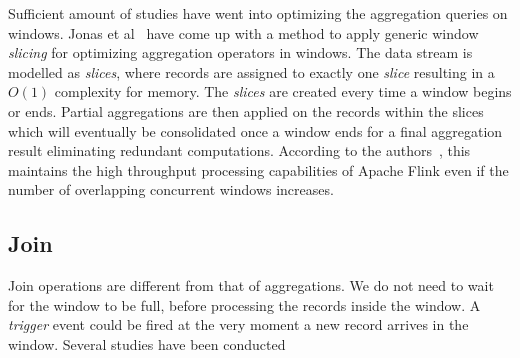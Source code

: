 Sufficient amount of studies have went into optimizing the aggregation queries 
on windows. Jonas et al~\cite{scotty, jonas_scotty} have come up with a method to 
apply generic window \emph{slicing} for optimizing aggregation operators in windows. 
The data stream is modelled as \emph{slices}, where 
records are assigned to exactly one \emph{slice} resulting in a 
$O(1)$ complexity for memory. The \emph{slices} are created every time a 
window begins or ends. Partial aggregations are then applied on the 
records within the slices which will eventually be consolidated once 
a window ends for a final aggregation result eliminating redundant 
computations. According to the authors~\cite{jonas_scotty}, this maintains 
the high throughput processing capabilities of Apache Flink even if the 
number of overlapping concurrent windows increases. 


\subsection{Join}%
\label{sub:Join}

Join operations are different from that of aggregations. We do not need 
to wait for the window to be full, before processing the records inside the 
window. A \emph{trigger} event could be fired at the very moment a new 
record arrives in the window. Several studies have been conducted    

